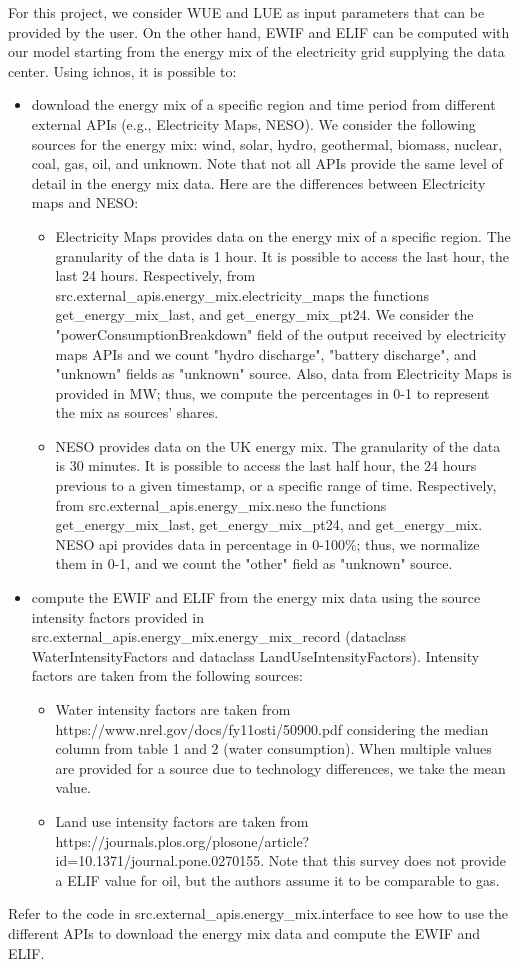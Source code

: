 For this project, we consider WUE and LUE as input parameters that can be provided by the user. On the other hand, EWIF and ELIF can be computed with our model starting from the energy mix of the electricity grid supplying the data center.
Using ichnos, it is possible to:
\begin{itemize}
    \item download the energy mix of a specific region and time period from different external APIs (e.g., Electricity Maps, NESO). We consider the following sources for the energy mix: wind, solar, hydro, geothermal, biomass, nuclear, coal, gas, oil, and unknown.
    Note that not all APIs provide the same level of detail in the energy mix data. Here are the differences between Electricity maps and NESO:
    \begin{itemize}
        \item Electricity Maps provides data on the energy mix of a specific region. The granularity of the data is 1 hour. It is possible to access the last hour, the last 24 hours. Respectively, from src.external_apis.energy_mix.electricity_maps the functions get_energy_mix_last, and get_energy_mix_pt24.
        We consider the "powerConsumptionBreakdown" field of the output received by electricity maps APIs and we count "hydro discharge", "battery discharge", and "unknown" fields as "unknown" source. Also, data from Electricity Maps is provided in MW; thus, we compute the percentages in 0-1 to represent the mix as sources' shares.
        \item NESO provides data on the UK energy mix. The granularity of the data is 30 minutes. It is possible to access the last half hour, the 24 hours previous to a given timestamp, or a specific range of time. Respectively, from src.external_apis.energy_mix.neso the functions get_energy_mix_last, get_energy_mix_pt24, and get_energy_mix. NESO api provides data in percentage in 0-100\%; thus, we normalize them in 0-1, and we count the "other" field as "unknown" source.
    \end{itemize}
    \item compute the EWIF and ELIF from the energy mix data using the source intensity factors provided in src.external_apis.energy_mix.energy_mix_record (dataclass WaterIntensityFactors and dataclass LandUseIntensityFactors). Intensity factors are taken from the following sources:
    \begin{itemize}
        \item Water intensity factors are taken from https://www.nrel.gov/docs/fy11osti/50900.pdf considering the median column from table 1 and 2 (water consumption). When multiple values are provided for a source due to technology differences, we take the mean value.
        \item Land use intensity factors are taken from https://journals.plos.org/plosone/article?id=10.1371/journal.pone.0270155. Note that this survey does not provide a ELIF value for oil, but the authors assume it to be comparable to gas.
    \end{itemize}
\end{itemize}
Refer to the code in src.external_apis.energy_mix.interface to see how to use the different APIs to download the energy mix data and compute the EWIF and ELIF.

